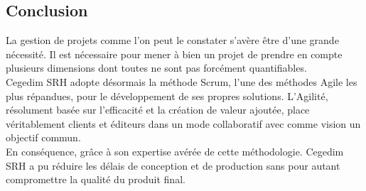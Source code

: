 \subsection*{Conclusion}
La gestion de projets comme l’on peut le constater s’avère être d’une grande nécessité. Il est nécessaire pour mener à bien un projet de prendre en compte plusieurs dimensions dont toutes ne sont pas forcément quantifiables.\\

Cegedim SRH adopte désormais la méthode Scrum, l'une des méthodes Agile les plus répandues, pour le développement de ses propres solutions. L'Agilité, résolument basée sur l'efficacité et la création de valeur ajoutée, place véritablement clients et éditeurs dans un mode collaboratif avec comme vision un objectif commun.\\

En conséquence, grâce à son expertise avérée de cette méthodologie. Cegedim SRH a pu réduire les délais de conception et de production sans pour autant compromettre la qualité du produit final.
